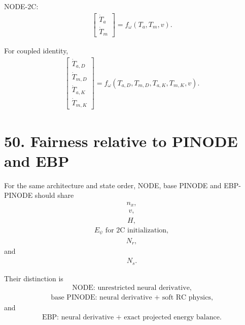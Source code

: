 \documentclass[11pt]{article}
\begin{document}
NODE-2C:
\begin{align}
\boxed{
\begin{bmatrix}
\dot T_a\\
\dot T_m
\end{bmatrix}
=
f_\omega(T_a,T_m,v).
}
\tag{N3.159}
\end{align}

For coupled identity,
\begin{align}
\boxed{
\begin{bmatrix}
\dot T_{a,D}\\
\dot T_{m,D}\\
\dot T_{a,K}\\
\dot T_{m,K}
\end{bmatrix}
=
f_\omega(T_{a,D},T_{m,D},T_{a,K},T_{m,K},v).
}
\tag{N3.160}
\end{align}

\section*{50. Fairness relative to PINODE and EBP}

For the same architecture and state order, NODE, base PINODE and EBP-PINODE should share
\begin{align}
\boxed{n_x,}
\end{align}
\begin{align}
\boxed{v,}
\end{align}
\begin{align}
\boxed{H,}
\end{align}
\begin{align}
\boxed{E_\psi\text{ for 2C initialization},}
\end{align}
\begin{align}
\boxed{N_r,}
\end{align}
and
\begin{align}
\boxed{N_s.}
\end{align}

Their distinction is
\begin{align}
\boxed{\text{NODE: unrestricted neural derivative},}
\end{align}
\begin{align}
\boxed{\text{base PINODE: neural derivative + soft RC physics},}
\end{align}
and
\begin{align}
\boxed{\text{EBP: neural derivative + exact projected energy balance}.}
\end{align}
\end{document}
